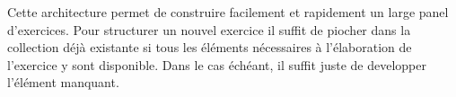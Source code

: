 Cette architecture permet de construire facilement et rapidement un large panel d'exercices. Pour structurer un nouvel exercice il suffit de piocher dans la collection déjà existante si tous les éléments nécessaires à l'élaboration de l'exercice y sont disponible. Dans le cas échéant, il suffit juste de developper l'élément manquant.






